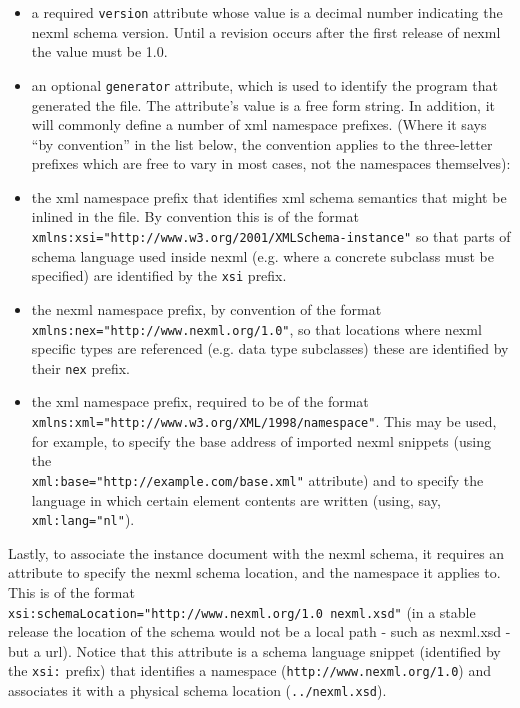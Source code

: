 \documentclass{article}
\newcommand{\code}{\texttt}
\begin{document}
\begin{itemize}

\item a required \code{version} attribute whose value is a decimal number indicating the nexml schema version. Until a revision
occurs after the first release of nexml the value must be 1.0.

\item an optional \code{generator} attribute, which is used to identify the program that generated the file. The attribute's value
is a free form string.
In addition, it will commonly define a number of xml namespace prefixes. (Where it says ``by convention'' in the list below, the convention applies to the three-letter prefixes which are free to vary in most cases, not the namespaces themselves):

\item the xml namespace prefix that identifies xml schema semantics that might be inlined in the file. By convention this is of the
format \\ \code{xmlns:xsi="http://www.w3.org/2001/XMLSchema-instance"} so that parts of schema language used inside nexml
(e.g. where a concrete subclass must be specified) are identified by the \code{xsi} prefix.

\item the nexml namespace prefix, by convention of the format \\ \code{xmlns:nex="http://www.nexml.org/1.0"}, so that  locations
where nexml specific types are referenced (e.g. data type subclasses) these are identified by their \code{nex} prefix.

\item the xml namespace prefix, required to be of the format \\ \code{xmlns:xml="http://www.w3.org/XML/1998/namespace"}. This may
be used, for example, to specify the base address of imported nexml snippets (using the \\
\code{xml:base="http://example.com/base.xml"} attribute) and to specify the language in which certain element contents are
written (using, say, \code{xml:lang="nl"}).

\end{itemize}

Lastly, to associate the instance document with the nexml schema, it requires an attribute to specify the nexml schema location, and
the namespace it applies to. This is of the format \\ \code{xsi:schemaLocation="http://www.nexml.org/1.0 nexml.xsd"} (in a stable
release the location of the schema would not be a local path - such as nexml.xsd - but a url). Notice that this attribute is a schema
language snippet (identified by the \code{xsi:} prefix) that identifies a namespace (\code{http://www.nexml.org/1.0})
and associates it with a physical schema location (\code{../nexml.xsd}).
\end{document}
